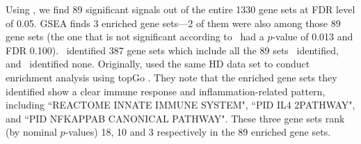 	
	Using \OurMethod, we find 89 significant signals out of the entire 1330 gene sets at FDR level
	of 0.05. GSEA finds 3 enriched gene sets---2 of them were also among those 89 gene sets (the one
	that is not significant according to \OurMethod~had a $p$-value of 0.013 and FDR 0.100).
	\genr~identified 387 gene sets which include all the 89 sets \OurMethod~identified, and 
	\CMT~identified none. Originally, \citet{labadorf2015rna} used the same HD data set to conduct 
	enrichment analysis using topGo \citep{alexa2010topgo}. They note that the enriched gene sets 
	they identified show a clear immune response and inflammation-related pattern, including 
	``REACTOME INNATE IMMUNE SYSTEM", ``PID IL4
	2PATHWAY", and ``PID NFKAPPAB CANONICAL PATHWAY". These three gene sets rank (by nominal
	$p$-values) 18, 10 and 3 respectively in the 89 enriched gene sets.
	
